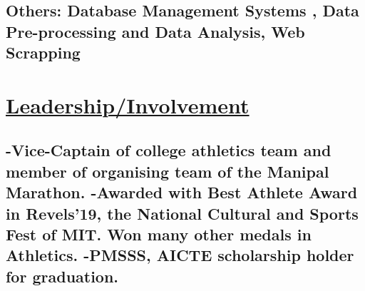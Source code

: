 \documentclass{article}
\begin{document}
\subsection{\textbf{Others:}
    \textmd{Database Management Systems , Data Pre-processing and Data Analysis, Web Scrapping}}




\section{\underline{Leadership/Involvement}}
\subsection{%
    \textmd{-Vice-Captain of college athletics team and member of organising team of the Manipal Marathon.}\newline
    \textmd{-Awarded with Best Athlete Award in Revels'19, the National Cultural and Sports Fest of MIT. Won many other medals in Athletics. }\newline
    \textmd{-PMSSS, AICTE scholarship holder for graduation.}}



\end{document}
